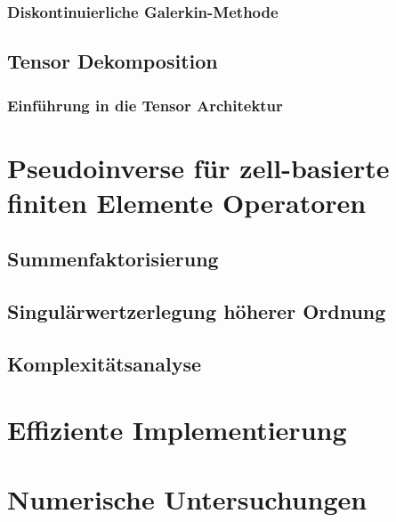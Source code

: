 \documentclass[12pt,a4paper]{scrartcl}
\numberwithin{equation}{section}
\begin{document}
\newpage
\subsubsection{Diskontinuierliche Galerkin-Methode}


\newpage
\subsection{Tensor Dekomposition}
\subsubsection{Einführung in die Tensor Architektur}




\newpage
\section{Pseudoinverse für zell-basierte finiten Elemente Operatoren }

\subsection{Summenfaktorisierung}


\newpage
\subsection{Singulärwertzerlegung höherer Ordnung}


\newpage
\subsection{Komplexitätsanalyse}



\newpage
\section{Effiziente Implementierung}


\newpage
\section{Numerische Untersuchungen}
\end{document}
